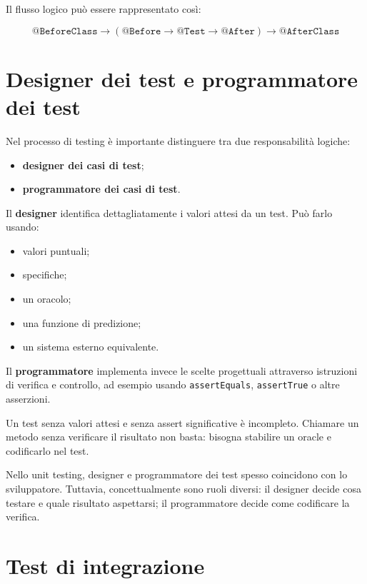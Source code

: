 Il flusso logico può essere rappresentato così:

\[
\texttt{@BeforeClass}
\rightarrow
(\texttt{@Before} \rightarrow \texttt{@Test} \rightarrow \texttt{@After})
\rightarrow
\texttt{@AfterClass}
\]

\section{Designer dei test e programmatore dei test}

Nel processo di testing è importante distinguere tra due responsabilità logiche:

\begin{itemize}
    \item \textbf{designer dei casi di test};
    \item \textbf{programmatore dei casi di test}.
\end{itemize}

Il \textbf{designer} identifica dettagliatamente i valori attesi da un test. Può farlo usando:

\begin{itemize}
    \item valori puntuali;
    \item specifiche;
    \item un oracolo;
    \item una funzione di predizione;
    \item un sistema esterno equivalente.
\end{itemize}

Il \textbf{programmatore} implementa invece le scelte progettuali attraverso istruzioni di verifica e controllo, ad esempio usando \texttt{assertEquals}, \texttt{assertTrue} o altre asserzioni.

\begin{notaesame}
Un test senza valori attesi e senza assert significative è incompleto. Chiamare un metodo senza verificare il risultato non basta: bisogna stabilire un oracle e codificarlo nel test.
\end{notaesame}

\begin{notaprof}
Nello unit testing, designer e programmatore dei test spesso coincidono con lo sviluppatore. Tuttavia, concettualmente sono ruoli diversi: il designer decide cosa testare e quale risultato aspettarsi; il programmatore decide come codificare la verifica.
\end{notaprof}

\section{Test di integrazione}

